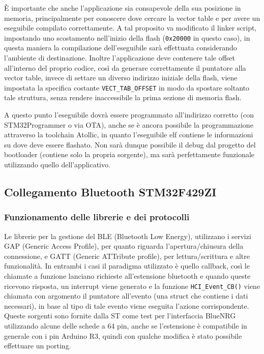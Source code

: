 \`E importante che anche l'applicazione sia consapevole della sua posizione in memoria, principalmente per conoscere dove cercare la vector table e per avere un eseguibile compilato correttamente. A tal proposito va modificato il linker script, impostando uno scostamento nell'inizio della flash (\texttt{0x20000} in questo caso), in questa maniera la compilazione dell'eseguibile sar\`a effettuata considerando l'ambiente di destinazione. Inoltre l'applicazione deve contenere tale offset all'interno del proprio codice, cos\`i da generare correttamente il puntatore alla vector table, invece di settare un diverso indirizzo iniziale della flash, viene impostata la specifica costante \texttt{VECT\_TAB\_OFFSET} in modo da spostare soltanto tale struttura, senza rendere inaccessibile la prima sezione di memoria flash.

A questo punto l'eseguibile dovr\`a essere programmato all'indirizzo corretto (con STM32Programmer o via OTA), anche se \`e ancora possibile la programmazione attraverso la toolchain Atollic, in quanto l'eseguibile elf contiene le informazioni su dove deve essere flashato. Non sar\`a dunque possibile il debug dal progetto del bootloader (contiene solo la propria sorgente), ma sar\`a perfettamente funzionale utilizzando quello dell'applicativo.

\subsection{Collegamento Bluetooth STM32F429ZI}

\subsubsection{Funzionamento delle librerie e dei protocolli}

Le librerie per la gestione del BLE (Bluetooth Low Energy), utilizzano i servizi GAP (Generic Access Profile), per quanto riguarda l'apertura/chiusura della connessione, e GATT (Generic ATTribute profile), per lettura/scrittura e altre funzionalit\`a. In entrambi i casi il paradigma utilizzato \`e quello callback, cos\`i le chiamate a funzione lanciano richieste all'estensione bluetooth e quando queste ricevono risposta, un interrupt viene generato e la funzione \texttt{HCI\_Event\_CB()} viene chiamata con argomento il puntatore all'evento (una struct che contiene i dati necessari), in base al tipo di tale evento viene eseguita l'azione corrispondente.
Queste sorgenti sono fornite dalla ST come test per l'interfaccia BlueNRG utilizzando alcune delle schede a 64 pin, anche se l'estensione \`e compatibile in generale con i pin Arduino R3, quindi con qualche modifica \`e stato possibile effettuare un porting.

